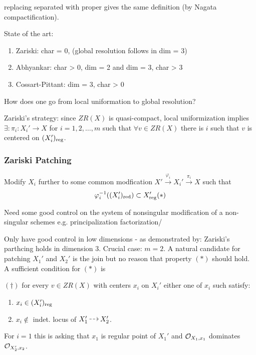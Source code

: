\documentclass[12pt]{article}
\begin{document}
\begin{rmk}
replacing separated with proper gives the same definition (by Nagata compactification). 
\end{rmk}

State of the art:
\begin{enumerate}
\item Zariski: char = 0, (global resolution follows in dim = 3)
\item Abhyankar: char > 0, dim = 2 and dim = 3, char > 3
\item Cossart-Pittant: dim = 3, char > 0
\end{enumerate}

How does one go from local uniformation to global resolution? 

Zariski's strategy: since $ZR(X)$  is quasi-compact, local uniformization implies $\exists : \pi_i : X_i' \to X$ for $i=1,2,\dots,m$ such that $\forall v \in ZR(X)$ there is $i$ such that $v$ is centered on $(X_i')_{\mathrm{reg}}$.

\subsubsection{Zariski Patching}

Modify $X_i$ further to some common modfication $X' \xrightarrow{\varphi_i} X_i' \xrightarrow{\pi_i} X$ such that
\[ \varphi_i^{-1}((X_i')_{\mathrm{red}}) \subset X_{\mathrm{reg}}' (\ast) \]

Need some good control on the system of nonsingular modification of a non-singular schemes e.g. principalization factorization/

Only have good control in low dimensions - as demonstrated by: Zariski's parthcing holds in dimension $3$. Crucial case: $m = 2$. A natural candidate for patching $X_1'$ and $X_2'$ is the join but no reason that property $(\ast)$ should hold. 
\\
A sufficient condition for $(\ast)$ is 
\begin{center}
$(\dagger)$ for every $v \in ZR(X)$ with centers $x_i$ on $X_i'$ either one of $x_i$ such satisfy:
\begin{enumerate}
\item $x_i \in (X_i')_{\mathrm{reg}}$
\item $x_i \notin$ indet. locus of $X_1' \rat X_2'$.
\end{enumerate}
\end{center}

For $i = 1$ this is asking that $x_1$ is regular point of $X_1'$ and $\mathcal{O}_{X_1, x_1}$ dominates $\mathcal{O}_{X_2', x_2}$.
\end{document}
